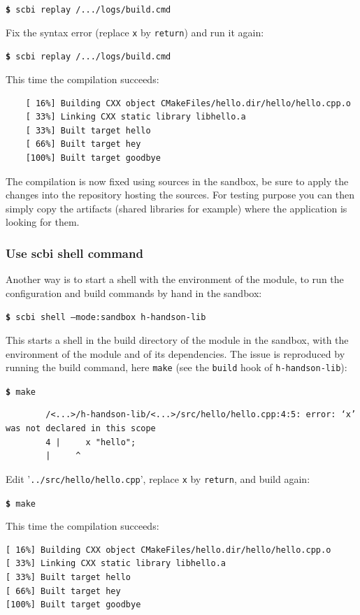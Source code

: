 \documentclass[a4paper,12pt,twoside]{article}
\newcommand{\code}[1]{\texttt{#1}}
\newcommand{\file}[1]{'{\texttt{#1}}'}
\newcommand{\cmd}[1]{\tabto{1cm}\hspace{0.5cm}\texttt{\textbf{\$} #1}}
\begin{document}
\cmd{scbi replay /.../logs/build.cmd}

Fix the syntax error (replace \code{x} by \code{return}) and run it again:

\cmd{scbi replay /.../logs/build.cmd}

This time the compilation succeeds:

\begin{verbatim}
	[ 16%] Building CXX object CMakeFiles/hello.dir/hello/hello.cpp.o
	[ 33%] Linking CXX static library libhello.a
	[ 33%] Built target hello
	[ 66%] Built target hey
	[100%] Built target goodbye
\end{verbatim}

The compilation is now fixed using sources in the sandbox, be sure to apply the changes into the repository hosting the sources. For testing purpose you can then simply copy the artifacts (shared libraries for example) where the application is looking for them.

\subsubsection{Use scbi shell command}

Another way is to start a shell with the environment of the module, to run the configuration and build commands by hand in the sandbox:

\cmd{scbi shell --mode:sandbox h-handson-lib}

This starts a shell in the build directory of the module in the sandbox, with the environment of the module and of its dependencies. The issue is reproduced by running the build command, here \code{make} (see the \code{build} hook of \code{h-handson-lib}):

\cmd{make}

\begin{footnotesize}
	\begin{verbatim}
		/<...>/h-handson-lib/<...>/src/hello/hello.cpp:4:5: error: ‘x’ was not declared in this scope
		4 |     x "hello";
		|     ^
\end{verbatim}
\end{footnotesize}

Edit \file{../src/hello/hello.cpp}, replace \code{x} by \code{return}, and build again:

\cmd{make}

This time the compilation succeeds:

\begin{verbatim}
[ 16%] Building CXX object CMakeFiles/hello.dir/hello/hello.cpp.o
[ 33%] Linking CXX static library libhello.a
[ 33%] Built target hello
[ 66%] Built target hey
[100%] Built target goodbye
\end{verbatim}
\end{document}
